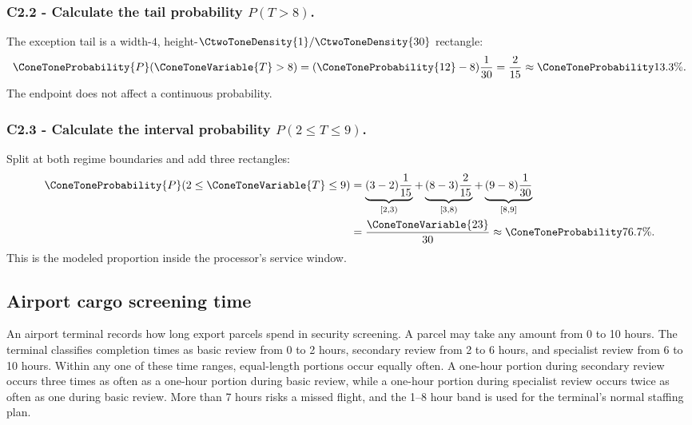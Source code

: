 \subsubsection*{C2.2 - Calculate the tail probability $P(T>8)$.}
\label{subsec:c2-piecewise-uniform-reconciliation-b}
The exception tail is a width-$4$, height-$\CtwoToneDensity{1}/\CtwoToneDensity{30}$ rectangle:
\[
 \ConeToneProbability{P}(\ConeToneVariable{T}>8)=(\ConeToneProbability{12}-8)\frac1{30}=\frac2{15}\approx\ConeToneProbability{13.3\%}.
\]
The endpoint does not affect a continuous probability.

\subsubsection*{C2.3 - Calculate the interval probability $P(2\le T\le9)$.}
\label{subsec:c2-piecewise-uniform-reconciliation-c}
Split at both regime boundaries and add three rectangles:
\[
 \begin{aligned}
 \ConeToneProbability{P}(2\le \ConeToneVariable{T}\le9)
 &=\underbrace{(3-2)\frac1{15}}_{[2,3)}
 +\underbrace{(8-3)\frac2{15}}_{[3,8)}
 +\underbrace{(9-8)\frac1{30}}_{[8,9]}\\
 &=\frac{\ConeToneVariable{23}}{30}\approx\ConeToneProbability{76.7\%}.
 \end{aligned}
\]
This is the modeled proportion inside the processor's service window.

\subsection{Airport cargo screening time}\label{sec:c2-piecewise-uniform-cargo}
An airport terminal records how long export parcels spend in security
screening.  A parcel may take any amount from 0 to 10 hours.  The terminal
classifies completion times as basic review from 0 to 2 hours, secondary review
from 2 to 6 hours, and specialist review from 6 to 10 hours.  Within any one of
these time ranges, equal-length portions occur equally often.  A one-hour
portion during secondary review occurs three times as often as a one-hour
portion during basic review, while a one-hour portion during specialist review
occurs twice as often as one during basic review.  More than 7 hours risks a
missed flight, and the 1--8 hour band is used for the terminal's normal staffing
plan.


